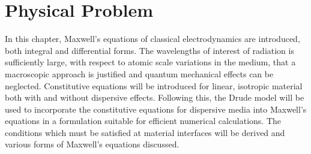 \chapter{Physical Problem}
\label{PhysicalProblemChapter}
In this chapter, Maxwell's equations of classical electrodynamics are introduced, both integral and differential forms. The wavelengths of interest of radiation is sufficiently large, with respect to atomic scale variations in the medium, that a macroscopic approach is justified and quantum mechanical effects can be neglected. Constitutive equations will be introduced for linear, isotropic material both with and without dispersive effects. Following this, the Drude model will be used to incorporate the constitutive equations for dispersive media into Maxwell's equations in a formulation suitable for efficient numerical calculations. The conditions which must be satisfied at material interfaces will be derived and various forms of Maxwell's equations discussed.

